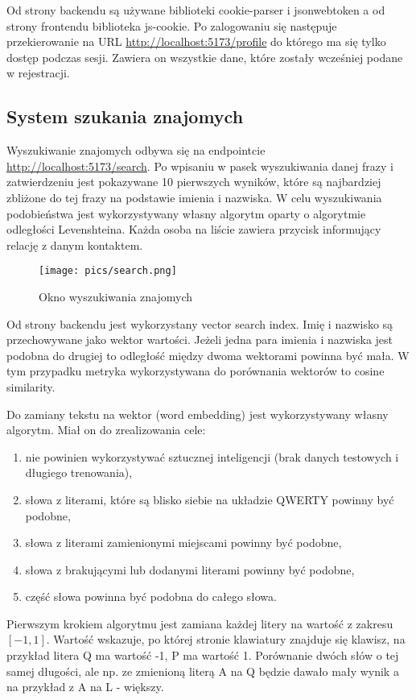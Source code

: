 \documentclass{article}
\begin{document}
Od strony backendu są używane biblioteki cookie-parser i jsonwebtoken
a od strony frontendu biblioteka js-cookie.
Po zalogowaniu się następuje przekierowanie na URL \url{http://localhost:5173/profile}
do którego ma się tylko dostęp podczas sesji. Zawiera on wszystkie dane, które zostały
wcześniej podane w rejestracji.

\newpage
\subsection{System szukania znajomych}
Wyszukiwanie znajomych odbywa się na endpointcie \url{http://localhost:5173/search}.
Po wpisaniu w pasek wyszukiwania danej frazy i zatwierdzeniu jest pokazywane
10 pierwszych wyników, które są najbardziej zbliżone do tej frazy
na podstawie imienia i nazwiska. W celu wyszukiwania podobieństwa jest wykorzystywany
własny algorytm oparty o algorytmie odległości Levenshteina.
Każda osoba na liście zawiera przycisk informujący relację z danym kontaktem.

\begin{figure}[h]
    \centering
    \texttt{[image: pics/search.png]}
    \caption*{Okno wyszukiwania znajomych}
\end{figure}

Od strony backendu jest wykorzystany vector search index.
Imię i nazwisko są przechowywane jako wektor wartości.
Jeżeli jedna para imienia i nazwiska jest podobna do drugiej
to odległość między dwoma wektorami powinna być mała. W tym przypadku metryka
wykorzystywana do porównania wektorów to cosine similarity.

Do zamiany tekstu na wektor (word embedding) jest wykorzystywany własny algorytm.
Miał on do zrealizowania cele:
\begin{enumerate}[itemsep=0mm]
  \item nie powinien wykorzystywać sztucznej inteligencji (brak danych testowych
  i długiego trenowania),
  \item słowa z literami, które są blisko siebie na układzie QWERTY
  powinny być podobne,
  \item słowa z literami zamienionymi miejscami powinny być podobne,
  \item słowa z brakującymi lub dodanymi literami powinny być podobne,
  \item część słowa powinna być podobna do całego słowa.
\end{enumerate}
Pierwszym krokiem algorytmu jest zamiana każdej litery na wartość z zakresu
$[-1, 1]$. Wartość wskazuje, po której stronie klawiatury znajduje się klawisz,
na przykład litera Q ma wartość -1, P ma wartość 1.
Porównanie dwóch słów o tej samej długości, ale np. ze zmienioną literą
A na Q będzie dawało mały wynik a na przykład z A na L - większy.
\end{document}
